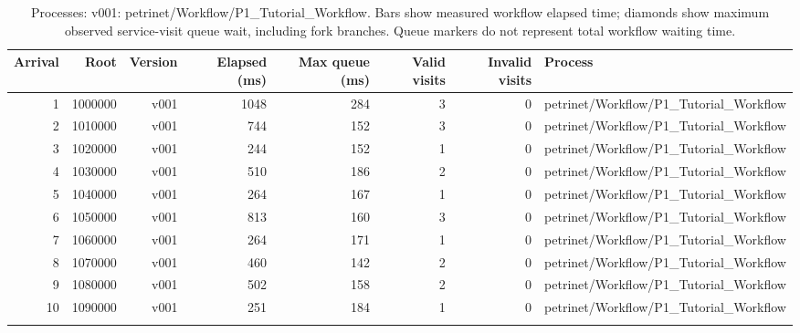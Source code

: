 \begin{longtable}{rrrrrrrp{5cm}}
\toprule
Arrival & Root & Version & Elapsed (ms) & Max queue (ms) & Valid visits & Invalid visits & Process \\
\midrule
\endhead
1 & 1000000 & v001 & 1048 & 284 & 3 & 0 & petrinet/Workflow/P1\_Tutorial\_Workflow \\
2 & 1010000 & v001 & 744 & 152 & 3 & 0 & petrinet/Workflow/P1\_Tutorial\_Workflow \\
3 & 1020000 & v001 & 244 & 152 & 1 & 0 & petrinet/Workflow/P1\_Tutorial\_Workflow \\
4 & 1030000 & v001 & 510 & 186 & 2 & 0 & petrinet/Workflow/P1\_Tutorial\_Workflow \\
5 & 1040000 & v001 & 264 & 167 & 1 & 0 & petrinet/Workflow/P1\_Tutorial\_Workflow \\
6 & 1050000 & v001 & 813 & 160 & 3 & 0 & petrinet/Workflow/P1\_Tutorial\_Workflow \\
7 & 1060000 & v001 & 264 & 171 & 1 & 0 & petrinet/Workflow/P1\_Tutorial\_Workflow \\
8 & 1070000 & v001 & 460 & 142 & 2 & 0 & petrinet/Workflow/P1\_Tutorial\_Workflow \\
9 & 1080000 & v001 & 502 & 158 & 2 & 0 & petrinet/Workflow/P1\_Tutorial\_Workflow \\
10 & 1090000 & v001 & 251 & 184 & 1 & 0 & petrinet/Workflow/P1\_Tutorial\_Workflow \\
\bottomrule
\caption{Processes: v001: petrinet/Workflow/P1\_Tutorial\_Workflow. Bars show measured workflow elapsed time; diamonds show maximum observed service-visit queue wait, including fork branches. Queue markers do not represent total workflow waiting time.}
\label{tab:workflow-elapsed-queue}
\end{longtable}
